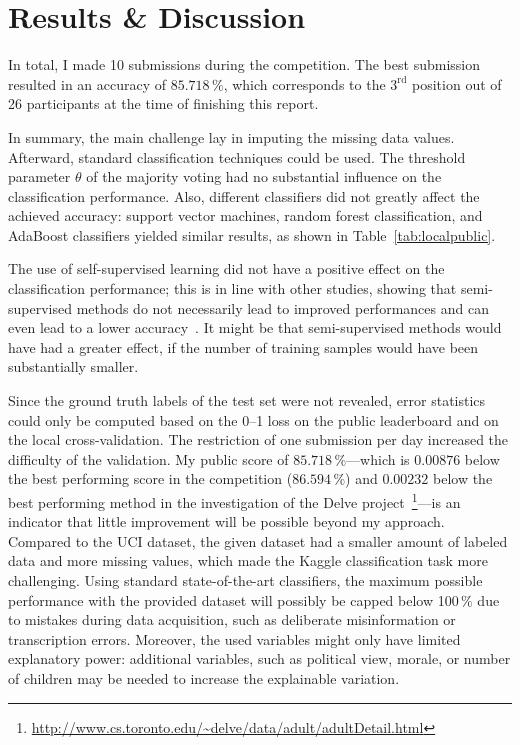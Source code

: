 \documentclass[a4paper,11pt]{article}
\begin{document}
\section{Results \& Discussion}
\label{sec:results}

In total, I made 10 submissions during the competition. The best
submission resulted in an accuracy of $85.718\,\%$, which corresponds
to the $3^{\text{rd}}$ position out of 26 participants at the time of
finishing this report.

In summary, the main challenge lay in imputing the missing data
values. Afterward, standard classification techniques could be
used. The threshold parameter $\theta$ of the majority voting had no
substantial influence on the classification performance. Also,
different classifiers did not greatly affect the achieved accuracy:
support vector machines, random forest classification, and AdaBoost
classifiers yielded similar results, as shown in
Table~\ref{tab:localpublic}.

The use of self-supervised learning did not have a positive effect on
the classification performance; this is in line with other studies,
showing that semi-supervised methods do not necessarily lead to
improved performances and can even lead to a lower
accuracy~\cite{zhu2005semi}. It might be that semi-supervised methods
would have had a greater effect, if the number of training samples
would have been substantially smaller.

Since the ground truth labels of the test set were not revealed, error
statistics could only be computed based on the 0--1 loss on the public
leaderboard and on the local cross-validation. The restriction of one
submission per day increased the difficulty of the validation. My
public score of $85.718\,\%$---which is $0.00876$ below the best
performing score in the competition ($86.594\,\%$) and $0.00232$ below
the best performing method in the investigation of the Delve
project~\footnote{\url{http://www.cs.toronto.edu/~delve/data/adult/adultDetail.html}}---is
an indicator that little improvement will be possible beyond my
approach. Compared to the UCI dataset, the given dataset had a smaller
amount of labeled data and more missing values, which made the Kaggle
classification task more challenging. Using standard state-of-the-art
classifiers, the maximum possible performance with the provided
dataset will possibly be capped below 100\,\% due to mistakes during
data acquisition, such as deliberate misinformation or transcription
errors. Moreover, the used variables might only have limited
explanatory power: additional variables, such as political view,
morale, or number of children may be needed to increase the
explainable variation.
\end{document}
